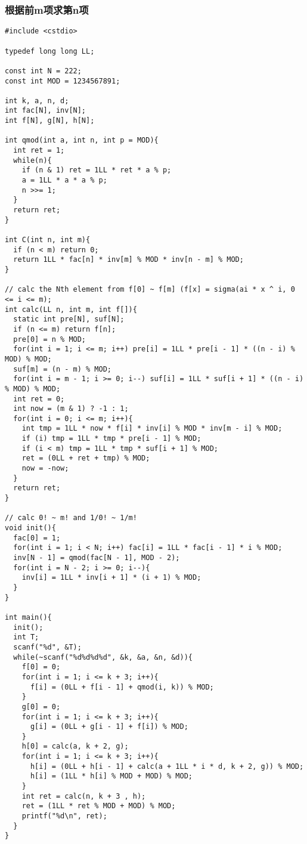 \subsubsection{根据前m项求第n项}
\begin{verbatim}
#include <cstdio>

typedef long long LL;

const int N = 222;
const int MOD = 1234567891;

int k, a, n, d;
int fac[N], inv[N];
int f[N], g[N], h[N];

int qmod(int a, int n, int p = MOD){
  int ret = 1;
  while(n){
    if (n & 1) ret = 1LL * ret * a % p;
    a = 1LL * a * a % p;
    n >>= 1;
  }
  return ret;
}

int C(int n, int m){
  if (n < m) return 0;
  return 1LL * fac[n] * inv[m] % MOD * inv[n - m] % MOD;
}

// calc the Nth element from f[0] ~ f[m] (f[x] = sigma(ai * x ^ i, 0 <= i <= m);
int calc(LL n, int m, int f[]){
  static int pre[N], suf[N];
  if (n <= m) return f[n];
  pre[0] = n % MOD;
  for(int i = 1; i <= m; i++) pre[i] = 1LL * pre[i - 1] * ((n - i) % MOD) % MOD;
  suf[m] = (n - m) % MOD;
  for(int i = m - 1; i >= 0; i--) suf[i] = 1LL * suf[i + 1] * ((n - i) % MOD) % MOD;
  int ret = 0;
  int now = (m & 1) ? -1 : 1;
  for(int i = 0; i <= m; i++){
    int tmp = 1LL * now * f[i] * inv[i] % MOD * inv[m - i] % MOD; 
    if (i) tmp = 1LL * tmp * pre[i - 1] % MOD;
    if (i < m) tmp = 1LL * tmp * suf[i + 1] % MOD;
    ret = (0LL + ret + tmp) % MOD;
    now = -now;
  }
  return ret;
}

// calc 0! ~ m! and 1/0! ~ 1/m!
void init(){
  fac[0] = 1;
  for(int i = 1; i < N; i++) fac[i] = 1LL * fac[i - 1] * i % MOD;
  inv[N - 1] = qmod(fac[N - 1], MOD - 2);
  for(int i = N - 2; i >= 0; i--){
    inv[i] = 1LL * inv[i + 1] * (i + 1) % MOD;
  }
}

int main(){
  init();
  int T;
  scanf("%d", &T);
  while(~scanf("%d%d%d%d", &k, &a, &n, &d)){
    f[0] = 0;
    for(int i = 1; i <= k + 3; i++){
      f[i] = (0LL + f[i - 1] + qmod(i, k)) % MOD;
    }
    g[0] = 0;
    for(int i = 1; i <= k + 3; i++){
      g[i] = (0LL + g[i - 1] + f[i]) % MOD;
    }
    h[0] = calc(a, k + 2, g);
    for(int i = 1; i <= k + 3; i++){
      h[i] = (0LL + h[i - 1] + calc(a + 1LL * i * d, k + 2, g)) % MOD;
      h[i] = (1LL * h[i] % MOD + MOD) % MOD;
    }
    int ret = calc(n, k + 3 , h);
    ret = (1LL * ret % MOD + MOD) % MOD;
    printf("%d\n", ret);
  }
}
\end{verbatim}
